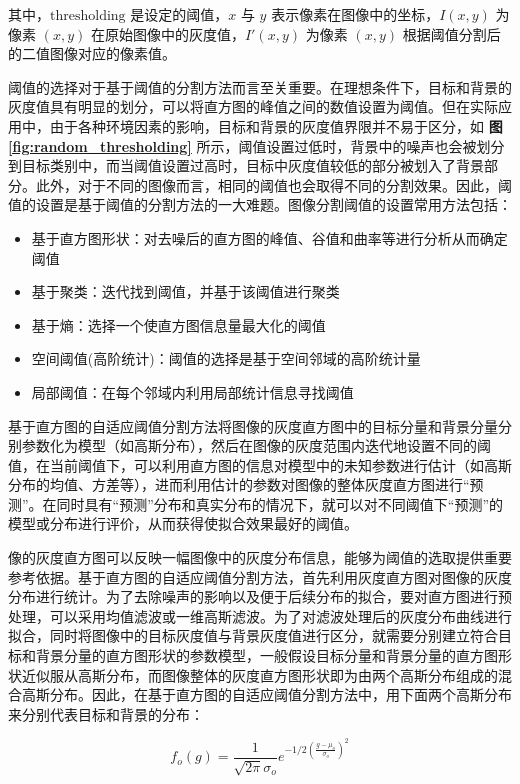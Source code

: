 其中，$\text{thresholding}$ 是设定的阈值，$x$ 与 $y$ 表示像素在图像中的坐标，$I(x, y)$ 为像素 $(x,y)$ 在原始图像中的灰度值，$I'(x, y)$ 为像素 $(x,y)$ 根据阈值分割后的二值图像对应的像素值。

阈值的选择对于基于阈值的分割方法而言至关重要。在理想条件下，目标和背景的灰度值具有明显的划分，可以将直方图的峰值之间的数值设置为阈值。但在实际应用中，由于各种环境因素的影响，目标和背景的灰度值界限并不易于区分，如 \textbf{图 \ref{fig:random_thresholding}} 所示，阈值设置过低时，背景中的噪声也会被划分到目标类别中，而当阈值设置过高时，目标中灰度值较低的部分被划入了背景部分。此外，对于不同的图像而言，相同的阈值也会取得不同的分割效果。因此，阈值的设置是基于阈值的分割方法的一大难题。图像分割阈值的设置常用方法包括：

\begin{itemize}
	\item 基于直方图形状：对去噪后的直方图的峰值、谷值和曲率等进行分析从而确定阈值
	\item 基于聚类：迭代找到阈值，并基于该阈值进行聚类
	\item 基于熵：选择一个使直方图信息量最大化的阈值
	\item 空间阈值(高阶统计)：阈值的选择是基于空间邻域的高阶统计量
	\item 局部阈值：在每个邻域内利用局部统计信息寻找阈值
\end{itemize}

基于直方图的自适应阈值分割方法将图像的灰度直方图中的目标分量和背景分量分别参数化为模型（如高斯分布），然后在图像的灰度范围内迭代地设置不同的阈值，在当前阈值下，可以利用直方图的信息对模型中的未知参数进行估计（如高斯分布的均值、方差等），进而利用估计的参数对图像的整体灰度直方图进行“预测”。在同时具有“预测”分布和真实分布的情况下，就可以对不同阈值下“预测”的模型或分布进行评价，从而获得使拟合效果最好的阈值。

像的灰度直方图可以反映一幅图像中的灰度分布信息，能够为阈值的选取提供重要参考依据。基于直方图的自适应阈值分割方法，首先利用灰度直方图对图像的灰度分布进行统计。为了去除噪声的影响以及便于后续分布的拟合，要对直方图进行预处理，可以采用均值滤波或一维高斯滤波。为了对滤波处理后的灰度分布曲线进行拟合，同时将图像中的目标灰度值与背景灰度值进行区分，就需要分别建立符合目标和背景分量的直方图形状的参数模型，一般假设目标分量和背景分量的直方图形状近似服从高斯分布，而图像整体的灰度直方图形状即为由两个高斯分布组成的混合高斯分布。因此，在基于直方图的自适应阈值分割方法中，用下面两个高斯分布来分别代表目标和背景的分布：

\begin{equation}
f_o(g)=\frac{1}{\sqrt{2 \pi} \sigma_o} e^{-1 / 2\left(\frac{g-\mu_o}{\sigma_o}\right)^2}
\end{equation}

